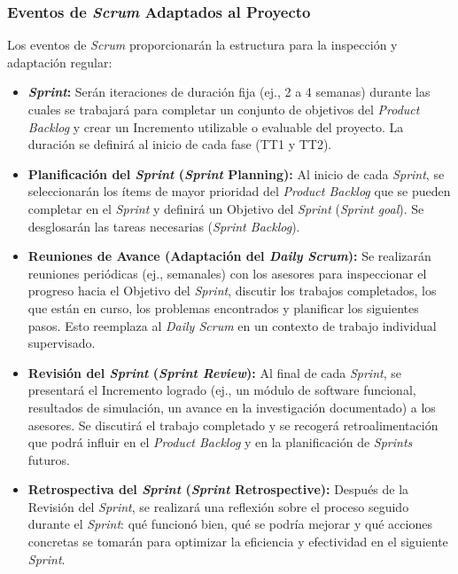\documentclass[12pt]{article}
\begin{document}
\subsubsection{Eventos de \textit{Scrum} Adaptados al Proyecto}
\label{sssec:eventos_scrum_proyecto}
Los eventos de \textit{Scrum} proporcionarán la estructura para la inspección y adaptación regular:
\begin{itemize}
    \item \textbf{\textit{Sprint}:} Serán iteraciones de duración fija (ej., 2 a 4 semanas) durante las cuales se trabajará para completar un conjunto de objetivos del \textit{Product Backlog} y crear un Incremento utilizable o evaluable del proyecto. La duración se definirá al inicio de cada fase (TT1 y TT2).
    \item \textbf{Planificación del \textit{Sprint} (\textit{Sprint} Planning):} Al inicio de cada \textit{Sprint}, se seleccionarán los ítems de mayor prioridad del \textit{Product Backlog} que se pueden completar en el \textit{Sprint} y definirá un Objetivo del \textit{Sprint} (\textit{Sprint goal}). Se desglosarán las tareas necesarias (\textit{Sprint Backlog}).
    \item \textbf{Reuniones de Avance (Adaptación del \textit{Daily Scrum}):} Se realizarán reuniones periódicas (ej., semanales) con los asesores para inspeccionar el progreso hacia el Objetivo del \textit{Sprint}, discutir los trabajos completados, los que están en curso, los problemas encontrados y planificar los siguientes pasos. Esto reemplaza al \textit{Daily Scrum} en un contexto de trabajo individual supervisado.
    \item \textbf{Revisión del \textit{Sprint} (\textit{Sprint Review}):} Al final de cada \textit{Sprint}, se presentará el Incremento logrado (ej., un módulo de software funcional, resultados de simulación, un avance en la investigación documentado) a los asesores. Se discutirá el trabajo completado y se recogerá retroalimentación que podrá influir en el \textit{Product Backlog} y en la planificación de \textit{Sprints} futuros.
    \item \textbf{Retrospectiva del \textit{Sprint} (\textit{Sprint} Retrospective):} Después de la Revisión del \textit{Sprint}, se realizará una reflexión sobre el proceso seguido durante el \textit{Sprint}: qué funcionó bien, qué se podría mejorar y qué acciones concretas se tomarán para optimizar la eficiencia y efectividad en el siguiente \textit{Sprint}.
\end{itemize}
\end{document}
